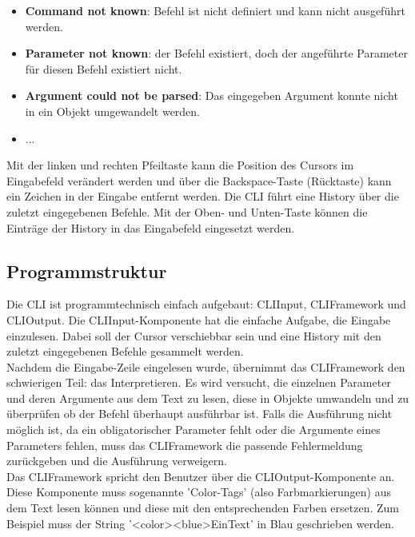 \documentclass[12pt,a4paper]{report}
\begin{document}
\begin{onehalfspace}
\begin{itemize}
\item \textbf{Command not known}: Befehl ist nicht definiert und kann nicht ausgeführt werden.
\item \textbf{Parameter not known}: der Befehl existiert, doch der angeführte Parameter für diesen Befehl existiert nicht.
\item \textbf{Argument could not be parsed}: Das eingegeben Argument konnte nicht in ein Objekt umgewandelt werden.
\item ...
\end{itemize}

Mit der linken und rechten Pfeiltaste kann die Position des Cursors im Eingabefeld verändert werden und über die Backspace-Taste (Rücktaste) kann ein Zeichen in der Eingabe entfernt werden. Die CLI führt eine History über die zuletzt eingegebenen Befehle. Mit der Oben- und Unten-Taste können die Einträge der History in das Eingabefeld eingesetzt werden.

\subsection{Programmstruktur}

Die CLI ist programmtechnisch einfach aufgebaut: CLIInput, CLIFramework und CLIOutput. Die CLIInput-Komponente hat die einfache Aufgabe, die Eingabe einzulesen. Dabei soll der Cursor verschiebbar sein und eine History mit den zuletzt eingegebenen Befehle gesammelt werden.\\
Nachdem die Eingabe-Zeile eingelesen wurde, übernimmt das CLIFramework den schwierigen Teil: das Interpretieren. Es wird versucht, die einzelnen Parameter und deren Argumente aus dem Text zu lesen, diese in Objekte umwandeln und zu überprüfen ob der Befehl überhaupt ausführbar ist. Falls die Ausführung nicht möglich ist, da ein obligatorischer Parameter fehlt oder die Argumente eines Parameters fehlen, muss das CLIFramework die passende Fehlermeldung zurückgeben und die Ausführung verweigern.\\
Das CLIFramework spricht den Benutzer über die CLIOutput-Komponente an. Diese Komponente muss sogenannte 'Color-Tags' (also Farbmarkierungen) aus dem Text lesen können und diese mit den entsprechenden Farben ersetzen. Zum Beispiel muss der String '<color><blue>EinText' in Blau geschrieben werden.


\end{onehalfspace}
\end{document}
